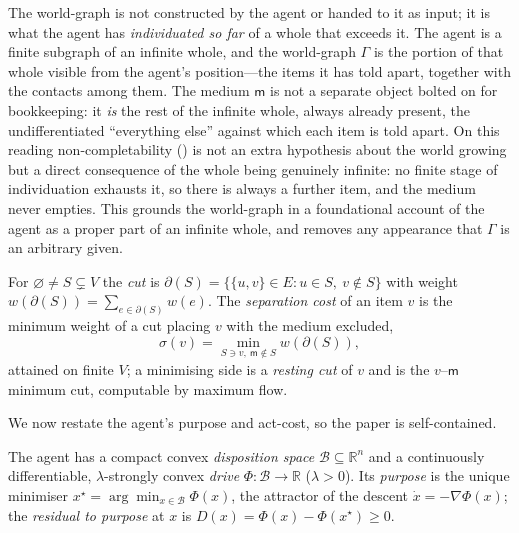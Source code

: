 \documentclass[11pt,twocolumn,a4paper]{article}
\newcommand{\R}{\mathbb{R}}
\newcommand{\Gph}{\Gamma}
\newcommand{\V}{V}
\newcommand{\E}{E}
\newcommand{\wt}{w}
\newcommand{\med}{\mathsf{m}}
\newcommand{\cut}{\partial}
\newcommand{\str}{\sigma}
\newcommand{\Purp}{x^{\star}}
\newcommand{\Beh}{\mathcal{B}}       %
\newcommand{\drive}{\Phi}
\newcommand{\dem}{D}
\begin{document}
\begin{remark}
\label{rem:infinitewhole}
The world-graph is not constructed by the agent or handed to it as input;
it is what the agent has \emph{individuated so far} of a whole that exceeds
it. The agent is a finite subgraph of an infinite whole, and the
world-graph $\Gph$ is the portion of that whole visible from the agent's
position---the items it has told apart, together with the contacts among
them. The medium $\med$ is not a separate object bolted on for bookkeeping:
it \emph{is} the rest of the infinite whole, always already present, the
undifferentiated ``everything else'' against which each item is told apart.
On this reading non-completability () is not an
extra hypothesis about the world growing but a direct consequence of the
whole being genuinely infinite: no finite stage of individuation exhausts
it, so there is always a further item, and the medium never empties. This
grounds the world-graph in a foundational account of the agent as a proper
part of an infinite whole, and removes any appearance that $\Gph$ is an
arbitrary given.
\end{remark}

\begin{definition}
\label{def:cut}
For $\varnothing\neq S\subsetneq\V$ the \emph{cut} is
$\cut(S)=\{\{u,v\}\in\E: u\in S,\ v\notin S\}$ with weight
$\wt(\cut(S))=\sum_{e\in\cut(S)}\wt(e)$. The \emph{separation cost} of an
item $v$ is the minimum weight of a cut placing $v$ with the medium
excluded,
\[
\str(v)=\min_{S\ni v,\ \med\notin S}\wt(\cut(S)),
\]
attained on finite $\V$; a minimising side is a \emph{resting cut} of $v$
and is the $v$--$\med$ minimum cut, computable by maximum flow.
\end{definition}

We now restate the agent's purpose and act-cost, so the paper is
self-contained.

\begin{definition}
\label{def:purpose}
The agent has a compact convex \emph{disposition space}
$\Beh\subseteq\R^n$ and a continuously differentiable, $\lambda$-strongly
convex \emph{drive} $\drive:\Beh\to\R$ ($\lambda>0$). Its \emph{purpose} is
the unique minimiser $\Purp=\arg\min_{x\in\Beh}\drive(x)$, the attractor of
the descent $\dot x=-\nabla\drive(x)$; the \emph{residual to purpose} at
$x$ is $\dem(x)=\drive(x)-\drive(\Purp)\ge0$.
\end{definition}
\end{document}
